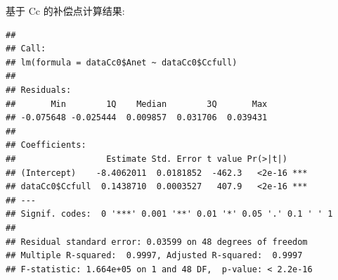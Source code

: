 \documentclass[
]{krantz}
\makeatletter
\newenvironment{Shaded}{\begin{snugshade}}{\end{snugshade}}
\newcommand{\CommentTok}[1]{\textcolor[rgb]{0.56,0.35,0.01}{\textit{#1}}}
\newcommand{\DecValTok}[1]{\textcolor[rgb]{0.00,0.00,0.81}{#1}}
\newcommand{\FunctionTok}[1]{\textcolor[rgb]{0.00,0.00,0.00}{#1}}
\newcommand{\NormalTok}[1]{#1}
\newcommand{\OtherTok}[1]{\textcolor[rgb]{0.56,0.35,0.01}{#1}}
\newcommand{\SpecialCharTok}[1]{\textcolor[rgb]{0.00,0.00,0.00}{#1}}
\newcommand{\StringTok}[1]{\textcolor[rgb]{0.31,0.60,0.02}{#1}}
\newenvironment{kframe}{%
\medskip{}
\setlength{\fboxsep}{.8em}
 \def\at@end@of@kframe{}%
 \ifinner\ifhmode%
  \def\at@end@of@kframe{\end{minipage}}%
  \begin{minipage}{\columnwidth}%
 \fi\fi%
 \def\FrameCommand##1{\hskip\@totalleftmargin \hskip-\fboxsep
 \colorbox{shadecolor}{##1}\hskip-\fboxsep
     \hskip-\linewidth \hskip-\@totalleftmargin \hskip\columnwidth}%
 \MakeFramed {\advance\hsize-\width
   \@totalleftmargin\z@ \linewidth\hsize
   \@setminipage}}%
 {\par\unskip\endMakeFramed%
 \at@end@of@kframe}
\renewenvironment{Shaded}{\begin{kframe}}{\end{kframe}}
\makeatother
\begin{document}
基于 Cc 的补偿点计算结果:

\begin{Shaded}
\end{Shaded}

\begin{verbatim}
## 
## Call:
## lm(formula = dataCc0$Anet ~ dataCc0$Ccfull)
## 
## Residuals:
##       Min        1Q    Median        3Q       Max 
## -0.075648 -0.025444  0.009857  0.031706  0.039431 
## 
## Coefficients:
##                  Estimate Std. Error t value Pr(>|t|)    
## (Intercept)    -8.4062011  0.0181852  -462.3   <2e-16 ***
## dataCc0$Ccfull  0.1438710  0.0003527   407.9   <2e-16 ***
## ---
## Signif. codes:  0 '***' 0.001 '**' 0.01 '*' 0.05 '.' 0.1 ' ' 1
## 
## Residual standard error: 0.03599 on 48 degrees of freedom
## Multiple R-squared:  0.9997, Adjusted R-squared:  0.9997 
## F-statistic: 1.664e+05 on 1 and 48 DF,  p-value: < 2.2e-16
\end{verbatim}
\end{document}
